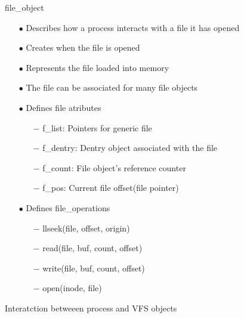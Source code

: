 \documentclass{beamer}
\begin{document}
\begin{frame}{file\_object}
	\begin{itemize}[<+->]
		\item[$\bullet$]{Describes how a process interacts with a file it has opened}
		\item[$\bullet$]{Creates when the file is opened}
		\item[$\bullet$]{Represents the file loaded into memory}
		\item[$\bullet$]{The file can be associated for many file objects}

		\item[$\bullet$]{Defines file atributes}
			\begin{itemize}
				\item[$-$]{f\_list: Pointers for generic file}
				\item[$-$]{f\_dentry: Dentry object associated with the file}
				\item[$-$]{f\_count: File object's reference counter}
				\item[$-$]{f\_pos: Current file offset(file pointer)}
			\end{itemize}
		\item[$\bullet$]{Defines file\_operations}
			\begin{itemize}
				\item[$-$]{llseek(file, offset, origin)}
				\item[$-$]{read(file, buf, count, offset)}
				\item[$-$]{write(file, buf, count, offset)}
				\item[$-$]{open(inode, file)}
			\end{itemize}
	\end{itemize}
\end{frame}

\begin{frame}{Interatction betweeen process and VFS objects}
	
	\let\thefootnote\relax{}

\end{frame}
\end{document}

